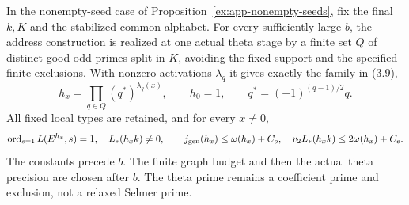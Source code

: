 \begin{proposition}\label{ex:app-final-family}
In the nonempty-seed case of Proposition~\ref{ex:app-nonempty-seeds},
fix the final $k,K$ and the stabilized common alphabet. For every
sufficiently large $b$, the address construction is realized at one
actual theta stage by a finite set $Q$ of distinct good odd primes
split in $K$, avoiding the fixed support and the specified finite
exclusions. With nonzero activations $\lambda_q$ it gives exactly
the family in (3.9),
\[
 h_x=\prod_{q\in Q}(q^*)^{\lambda_q(x)},\qquad h_0=1,
 \qquad q^*=(-1)^{(q-1)/2}q.
\]
All fixed local types are retained, and for every $x\ne0$,
\[
 \operatorname{ord}_{s=1}L(E^{h_x},s)=1,\quad L_*(h_xk)\ne0,
 \qquad j_{\rm gen}(h_x)\le\omega(h_x)+C_o,\quad
 v_2L_*(h_xk)\le2\omega(h_x)+C_e.
\]
The constants precede $b$. The finite graph budget and then the
actual theta precision are chosen after $b$. The theta prime remains
a coefficient prime and exclusion, not a relaxed Selmer prime.
\end{proposition}
